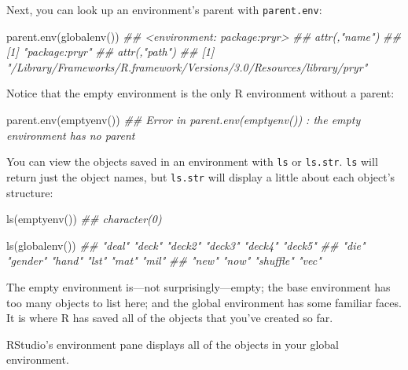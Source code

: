 \documentclass[
  letterpaper,
  DIV=11,
  numbers=noendperiod]{scrbook}
\newenvironment{Shaded}{\begin{snugshade}}{\end{snugshade}}
\newcommand{\DocumentationTok}[1]{\textcolor[rgb]{0.37,0.37,0.37}{\textit{#1}}}
\newcommand{\FunctionTok}[1]{\textcolor[rgb]{0.28,0.35,0.67}{#1}}
\newcommand{\NormalTok}[1]{\textcolor[rgb]{0.00,0.23,0.31}{#1}}
\begin{document}
Next, you can look up an environment's parent with \texttt{parent.env}:

\begin{Shaded}
\begin{Highlighting}[]
\FunctionTok{parent.env}\NormalTok{(}\FunctionTok{globalenv}\NormalTok{())}
\DocumentationTok{\#\# \textless{}environment: package:pryr\textgreater{}}
\DocumentationTok{\#\# attr(,"name")}
\DocumentationTok{\#\# [1] "package:pryr"}
\DocumentationTok{\#\# attr(,"path")}
\DocumentationTok{\#\# [1] "/Library/Frameworks/R.framework/Versions/3.0/Resources/library/pryr"}
\end{Highlighting}
\end{Shaded}

Notice that the empty environment is the only R environment without a
parent:

\begin{Shaded}
\begin{Highlighting}[]
\FunctionTok{parent.env}\NormalTok{(}\FunctionTok{emptyenv}\NormalTok{())}
\DocumentationTok{\#\# Error in parent.env(emptyenv()) : the empty environment has no parent}
\end{Highlighting}
\end{Shaded}

You can view the objects saved in an environment with \texttt{ls} or
\texttt{ls.str}. \texttt{ls} will return just the object names, but
\texttt{ls.str} will display a little about each object's structure:

\begin{Shaded}
\begin{Highlighting}[]
\FunctionTok{ls}\NormalTok{(}\FunctionTok{emptyenv}\NormalTok{())}
\DocumentationTok{\#\# character(0)}

\FunctionTok{ls}\NormalTok{(}\FunctionTok{globalenv}\NormalTok{())}
\DocumentationTok{\#\#  "deal"    "deck"    "deck2"   "deck3"   "deck4"   "deck5"  }
\DocumentationTok{\#\#  "die"     "gender"  "hand"    "lst"     "mat"     "mil"    }
\DocumentationTok{\#\#  "new"     "now"     "shuffle" "vec"  }
\end{Highlighting}
\end{Shaded}

The empty environment is---not surprisingly---empty; the base
environment has too many objects to list here; and the global
environment has some familiar faces. It is where R has saved all of the
objects that you've created so far.

\begin{tcolorbox}[enhanced jigsaw, breakable, colback=white, colbacktitle=quarto-callout-tip-color!10!white, arc=.35mm, bottomrule=.15mm, coltitle=black, left=2mm, rightrule=.15mm, colframe=quarto-callout-tip-color-frame, leftrule=.75mm, opacitybacktitle=0.6, bottomtitle=1mm, toptitle=1mm, titlerule=0mm, opacityback=0, title=\textcolor{quarto-callout-tip-color}{\faLightbulb}\hspace{0.5em}{Tip}, toprule=.15mm]

RStudio's environment pane displays all of the objects in your global
environment.

\end{tcolorbox}
\end{document}
